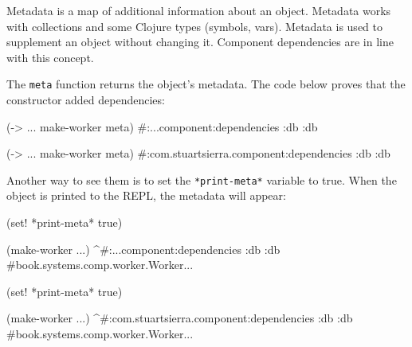 Metadata is a map of additional information about an object. Metadata works with collections and some Clojure types (symbols, vars). Metadata is used to supplement an object without changing it. Component dependencies are in line with this concept.

The \verb|meta| function returns the object's metadata. The code below proves that the constructor added dependencies:

\ifnarrow

\begin{english}
  \begin{clojure}
(-> {...} make-worker meta)
#:...component{:dependencies {:db :db}}
  \end{clojure}
\end{english}

\else

\begin{english}
  \begin{clojure}
(-> {...} make-worker meta)
#:com.stuartsierra.component{:dependencies {:db :db}}
  \end{clojure}
\end{english}

\fi

Another way to see them is to set the \verb|*print-meta*| variable to true. When the object is printed to the REPL, the metadata will appear:


\ifnarrow

\begin{english}
  \begin{clojure}
(set! *print-meta* true)

(make-worker {...})
^#:...component{:dependencies {:db :db}}
#book.systems.comp.worker.Worker{...}
  \end{clojure}
\end{english}

\else

\begin{english}
  \begin{clojure}
(set! *print-meta* true)

(make-worker {...})
^#:com.stuartsierra.component{:dependencies {:db :db}}
#book.systems.comp.worker.Worker{...}
  \end{clojure}
\end{english}

\fi

